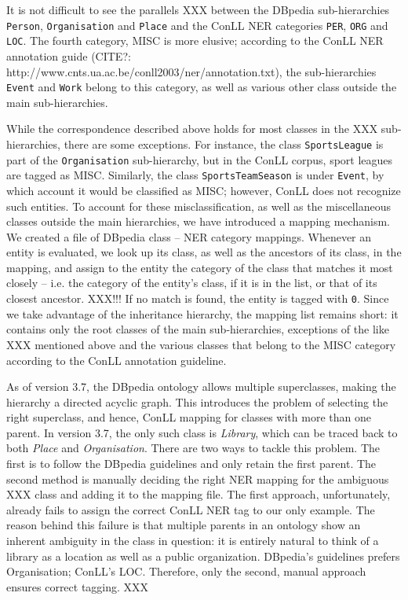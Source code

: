 \documentclass[11pt]{article}
\begin{document}
It is not difficult to see the parallels XXX between the DBpedia sub-hierarchies \texttt{Person}, \texttt{Organisation} and \texttt{Place} and the ConLL NER categories \texttt{PER}, \texttt{ORG} and \texttt{LOC}. The fourth category, MISC is more elusive; according to the ConLL NER annotation guide (CITE?: http://www.cnts.ua.ac.be/conll2003/ner/annotation.txt), the sub-hierarchies \texttt{Event} and \texttt{Work} belong to this category, as well as various other class outside the main sub-hierarchies. 

While the correspondence described above holds for most classes in the XXX sub-hierarchies, there are some exceptions. For instance, the class \texttt{SportsLeague} is part of the \texttt{Organisation} sub-hierarchy, but in the ConLL corpus, sport leagues are tagged as MISC. Similarly, the class \texttt{SportsTeamSeason} is under \texttt{Event}, by which account it would be classified as MISC; however, ConLL does not recognize such entities. To account for these misclassification, as well as the miscellaneous classes outside the main hierarchies, we have introduced a mapping mechanism. We created a file of DBpedia class -- NER category mappings. Whenever an entity is evaluated, we look up its class, as well as the ancestors of its class, in the mapping, and assign to the entity the category of the class that matches it most closely -- i.e. the category of the entity's class, if it is in the list, or that of its closest ancestor. XXX!!! If no match is found, the entity is tagged with \texttt{0}. Since we take advantage of the inheritance hierarchy, the mapping list remains short: it contains only the root classes of the main sub-hierarchies, exceptions of the like XXX mentioned above and the various classes that belong to the MISC category according to the ConLL annotation guideline.

As of version 3.7, the DBpedia ontology allows multiple superclasses, making the hierarchy a directed acyclic graph. This introduces the problem of selecting the right superclass, and hence, ConLL mapping for classes with more than one parent. In version 3.7, the only such class is \textit{Library}, which can be traced back to both \textit{Place} and \textit{Organisation}. There are two ways to tackle this problem. The first is to follow the DBpedia guidelines and only retain the first parent. The second method is manually deciding the right NER mapping for the ambiguous XXX class and adding it to the mapping file. The first approach, unfortunately, already fails to assign the correct ConLL NER tag to our only example. The reason behind this failure is that multiple parents in an ontology show an inherent ambiguity in the class in question: it is entirely natural to think of a library as a location as well as a public organization. DBpedia's guidelines prefers Organisation; ConLL's LOC. Therefore, only the second, manual approach ensures correct tagging. XXX
\end{document}
